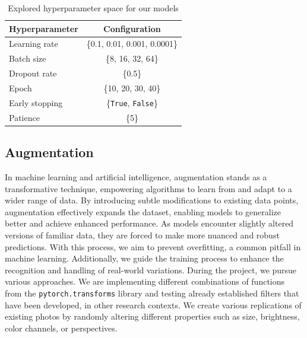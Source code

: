 \begin{table}
  \centering
  \begin{tabular}{@{}lc@{}}
    \toprule
    Hyperparameter & Configuration \\
    \midrule
    Learning rate & \{0.1, 0.01, 0.001, 0.0001\}  \\
    Batch size & \{8, 16, 32, 64\} \\
    Dropout rate & \{0.5\} \\
    Epoch & \{10, 20, 30, 40\} \\
    Early stopping & \{\texttt{True}, \texttt{False}\} \\
    Patience & \{5\} \\
    \bottomrule
  \end{tabular}
  \caption{Explored hyperparameter space for our models}
  \label{tab:hyper}
\end{table}

\subsection{Augmentation}
\label{sec:optim:aug}
In machine learning and artificial intelligence, 
augmentation stands as a transformative technique, 
empowering algorithms to learn from and adapt to a wider range of data. 
By introducing subtle modifications to existing data points, 
augmentation effectively expands the dataset, 
enabling models to generalize better and achieve enhanced performance.
As models encounter slightly altered versions of familiar data, 
they are forced to make more nuanced and robust predictions. 
With this process, we aim to prevent overfitting, 
a common pitfall in machine learning. 
Additionally, we guide the training process to enhance the recognition and handling of real-world variations.
During the project, we pursue various approaches. 
We are implementing different combinations of functions from the \texttt{pytorch.transforms} library and testing already established filters that have been developed, in other research contexts. 
We create various replications of existing photos by randomly altering different properties such as size, brightness, color channels, or perspectives.

